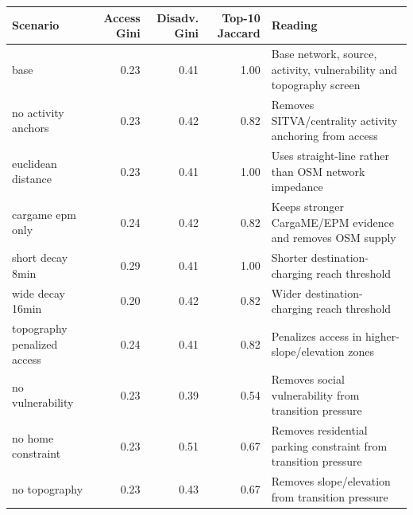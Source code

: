 \begin{tabular}{lrrrp{}}
\toprule
Scenario & Access Gini & Disadv. Gini & Top-10 Jaccard & Reading \\
\midrule
base & 0.23 & 0.41 & 1.00 & Base network, source, activity, vulnerability and topography screen \\
no activity anchors & 0.23 & 0.42 & 0.82 & Removes SITVA/centrality activity anchoring from access \\
euclidean distance & 0.23 & 0.41 & 1.00 & Uses straight-line rather than OSM network impedance \\
cargame epm only & 0.24 & 0.42 & 0.82 & Keeps stronger CargaME/EPM evidence and removes OSM supply \\
short decay 8min & 0.29 & 0.41 & 1.00 & Shorter destination-charging reach threshold \\
wide decay 16min & 0.20 & 0.42 & 0.82 & Wider destination-charging reach threshold \\
topography penalized access & 0.24 & 0.41 & 0.82 & Penalizes access in higher-slope/elevation zones \\
no vulnerability & 0.23 & 0.39 & 0.54 & Removes social vulnerability from transition pressure \\
no home constraint & 0.23 & 0.51 & 0.67 & Removes residential parking constraint from transition pressure \\
no topography & 0.23 & 0.43 & 0.67 & Removes slope/elevation from transition pressure \\
\bottomrule
\end{tabular}
